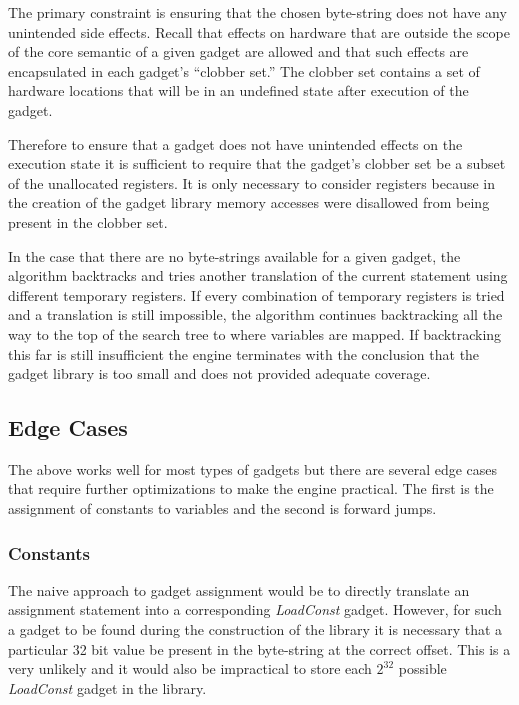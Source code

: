    The primary constraint is ensuring that the chosen byte-string does not have
    any unintended side effects. Recall that effects on hardware that are
    outside the scope of the core semantic of a given gadget are allowed and
    that such effects are encapsulated in each gadget's ``clobber set.'' The
    clobber set contains a set of hardware locations that will be in an
    undefined state after execution of the gadget.

    Therefore to ensure that a gadget does not have unintended effects on the
    execution state it is sufficient to require that the gadget's clobber set be
    a subset of the unallocated registers. It is only necessary to consider
    registers because in the creation of the gadget library memory accesses were
    disallowed from being present in the clobber set.

    In the case that there are no byte-strings available for a given gadget, the
    algorithm backtracks and tries another translation of the current statement
    using different temporary registers. If every combination of temporary
    registers is tried and a translation is still impossible, the algorithm
    continues backtracking all the way to the top of the search tree to where
    variables are mapped. If backtracking this far is still insufficient the
    engine terminates with the conclusion that the gadget library is too small
    and does not provided adequate coverage. 

    \subsection{Edge Cases}

    The above works well for most types of gadgets but there are several edge
    cases that require further optimizations to make the engine practical. The
    first is the assignment of constants to variables and the second is forward
    jumps.

    \subsubsection{Constants}

    The naive approach to gadget assignment would be to directly translate an
    assignment statement into a corresponding \emph{LoadConst} gadget. However,
    for such a gadget to be found during the construction of the library it is
    necessary that a particular 32 bit value be present in the byte-string at
    the correct offset. This is a very unlikely and it would also be impractical
    to store each $2^{32}$ possible \emph{LoadConst} gadget in the library. 


